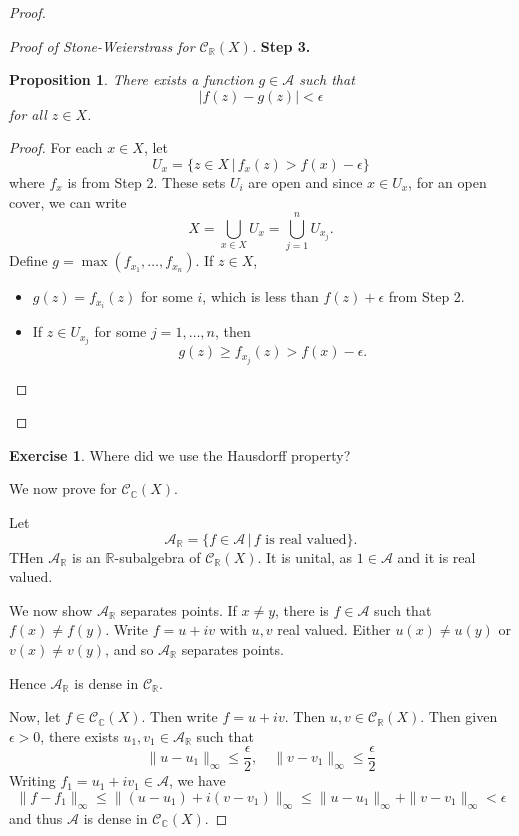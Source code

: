 \documentclass[10pt, oneside, reqno]{amsart}
\theoremstyle{plain}%
\newtheorem{prop}[thm]{Proposition}
\theoremstyle{definition}
\newtheorem{exer}[thm]{Exercise}
\theoremstyle{remark}
\newcommand{\given}{ \, | \,}
\newcommand{\R}{\mathbb{R}}
\newcommand{\Com}{\mathbb{C}}
\begin{document}
\begin{proof}
\begin{proof}[Proof of Stone-Weierstrass for $\mathcal{C}_\R(X)$]
        \textbf{Step 3.}  \begin{prop}
            There exists a function $g \in \mathcal{A}$ such that \[
                |f(z) - g(z) | < \epsilon
            \] for all $z \in X$.  
        \end{prop}
        \begin{proof}
            For each $x \in X$, let \[
                U_x = \{ z \in X \, | \, f_x(z) > f(x) - \epsilon \} 
            \] where $f_x$ is from Step 2.  These sets $U_i$ are open and since $x \in U_x$, for an open cover, we can write \[
                X = \bigcup_{x \in X} U_x = \bigcup_{j=1}^n U_{x_j}.
            \]  
            Define $g = \max(f_{x_1}, \dots, f_{x_n})$.  If $z \in X$, 
            \begin{itemize}
                \item $g(z) = f_{x_i}(z)$ for some $i$, which is less than $f(z) + \epsilon$ from Step 2.
                \item If $z \in U_{x_j}$ for some $j = 1, \dots, n$, then \[
                    g(z) \geq f_{x_j}(z) > f(x) - \epsilon.  
                \]
            \end{itemize}
        \end{proof} 
    \end{proof}
    \begin{exer}
        Where did we use the Hausdorff property?
    \end{exer}
    
    We now prove for $\mathcal{C}_\Com(X)$.  
    
    Let \[ 
    \mathcal A_\R = \{ f \in \mathcal A \given \text{$f$ is real valued} \}. 
    \]  THen $\mathcal A_\R$ is an $\R$-subalgebra of $\mathcal C_\R(X)$.  It is unital, as $1 \in \mathcal A$ and it is real valued. 
    
    We now show $\mathcal A_\R$ separates points.  If $x \neq y$, there is $f \in \mathcal A$ such that $f(x) \neq f(y)$.  Write $f = u + iv$ with $u,v$ real valued.  Either $u(x) \neq u(y)$ or $v(x) \neq v(y)$, and so $\mathcal A_\R$ separates points.  
    
    Hence $\mathcal A_\R$ is dense in $\mathcal C_\R$.  
    
    Now, let $f \in \mathcal C_\Com(X)$.  Then write $f = u + iv$.  Then $u,v \in \mathcal C_\R(X)$.  Then given $\epsilon > 0$, there exists $u_1,v_1 \in \mathcal A_\R$ such that \[
        \| u - u_1 \|_\infty \leq \frac{\epsilon}{2}, \quad \| v - v_1 \|_\infty \leq \frac{\epsilon}{2} 
    \]  Writing $f_1 = u_1 + i v_1 \in \mathcal{A}$, we have \[
        \| f - f_1 \|_\infty \leq \| (u - u_1) + i(v-v_1) \|_\infty \leq \| u - u_1 \|_\infty + \| v - v_1 \|_\infty < \epsilon
    \] and thus $\mathcal{A}$ is dense in $\mathcal C_\Com(X)$.
\end{proof}
\end{document}
